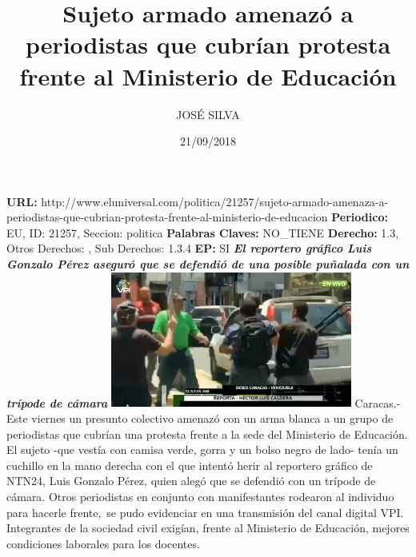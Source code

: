 \documentclass{article}%
\title{\textbf{Sujeto armado amenazó a periodistas que cubrían protesta frente al Ministerio de Educación}}%
\author{JOSÉ SILVA}%
\date{21/09/2018}%
\begin{document}
%
\normalsize%
\maketitle%
\textbf{URL: }%
http://www.eluniversal.com/politica/21257/sujeto{-}armado{-}amenaza{-}a{-}periodistas{-}que{-}cubrian{-}protesta{-}frente{-}al{-}ministerio{-}de{-}educacion\newline%
%
\textbf{Periodico: }%
EU, %
ID: %
21257, %
Seccion: %
politica\newline%
%
\textbf{Palabras Claves: }%
NO\_TIENE\newline%
%
\textbf{Derecho: }%
1.3, %
Otros Derechos: %
, %
Sub Derechos: %
1.3.4\newline%
%
\textbf{EP: }%
SI\newline%
\newline%
%
\textbf{\textit{El reportero gráfico Luis Gonzalo Pérez aseguró que se defendió de una posible puñalada con un trípode de cámara}}%
\newline%
\newline%
%
\includegraphics[width=300px]{180.jpg}%
\newline%
%
Caracas.{-} Este viernes un presunto colectivo amenazó con un arma blanca a un grupo de periodistas que cubrían una protesta frente a la sede del Ministerio de Educación.%
\newline%
%
El sujeto {-}que vestía con camisa verde, gorra y un bolso negro de lado{-} tenía un cuchillo en la mano derecha con el que intentó herir al reportero gráfico de NTN24, Luis Gonzalo Pérez, quien alegó que se defendió con un trípode de cámara.%
\newline%
%
Otros periodistas en conjunto con manifestantes rodearon al individuo para hacerle frente,~se pudo evidenciar en una transmisión del canal digital VPI.%
\newline%
%
Integrantes de la sociedad civil exigían, frente al Ministerio de Educación, mejores condiciones laborales para los docentes.%
\newline%
%
\end{document}
